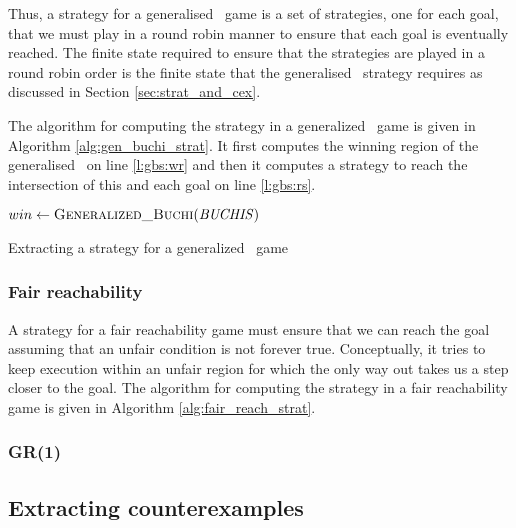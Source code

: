 Thus, a strategy for a generalised \buchi\ game is a set of strategies, one for each goal, that we must play in a round robin manner to ensure that each goal is eventually reached. The finite state required to ensure that the strategies are played in a round robin order is the finite state that the generalised \buchi\ strategy requires as discussed in Section \ref{sec:strat_and_cex}.

The algorithm for computing the strategy in a generalized \buchi\ game is given in Algorithm \ref{alg:gen_buchi_strat}. It first computes the winning region of the generalised \buchi\ on line \ref{l:gbs:wr} and then it computes a strategy to reach the intersection of this and each goal on line \ref{l:gbs:rs}.

\begin{algorithm}[t]
\begin{algorithmic}

\State $win \gets \Call{Generalized\_Buchi}{\genbuchiobj}$ \label{l:gbs:wr}
        \State \Return {} \label{l:gbs:rs}
    \EndFor
\EndFunction

\end{algorithmic}
\caption{Extracting a strategy for a generalized \buchi\ game}
\label{alg:gen_buchi_strat}
\end{algorithm}

\subsubsection{Fair reachability}

A strategy for a fair reachability game must ensure that we can reach the goal assuming that an unfair condition is not forever true. Conceptually, it tries to keep execution within an unfair region for which the only way out takes us a step closer to the goal. The algorithm for computing the strategy in a fair reachability game is given in Algorithm \ref{alg:fair_reach_strat}.

\subsubsection{GR(1)}

\subsection{Extracting counterexamples}

